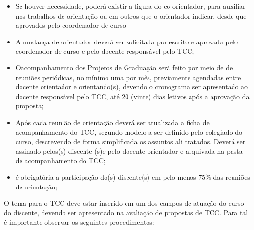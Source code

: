 \begin{itemize}
	\item Se houver necessidade, poderá existir a figura do co-orientador, para auxiliar nos trabalhos de orientação ou em outros que o orientador indicar, desde que aprovados pelo coordenador de curso;

	\item A mudança de orientador deverá ser solicitada por escrito e aprovada pelo coordenador de curso e pelo docente responsável pelo TCC;

	 \item Oacompanhamento dos Projetos de Graduação será feito por meio de de reuniões periódicas, no mínimo uma por mês, previamente agendadas entre docente orientador e orientando(s), devendo o cronograma ser apresentado ao docente responsável pelo TCC, até 20 (vinte) dias letivos após a aprovação da proposta;

	 \item Após cada reunião de orientação deverá ser atualizada a ficha de acompanhamento do TCC, segundo modelo a ser definido pelo colegiado do curso, descrevendo de forma simplificada os assuntos ali tratados. Deverá ser assinado pelos(s) discente (s)e pelo docente orientador e arquivada na pasta de acompanhamento do TCC;

	 \item é obrigatória a participação do(s) discente(s) em pelo menos 75\% das reuniões de orientação;
\end{itemize}

	 O tema para o TCC deve estar inserido em um dos campos de atuação do curso do discente, devendo ser apresentado na avaliação de propostas de TCC. Para tal é importante observar os seguintes procedimentos:
	 
